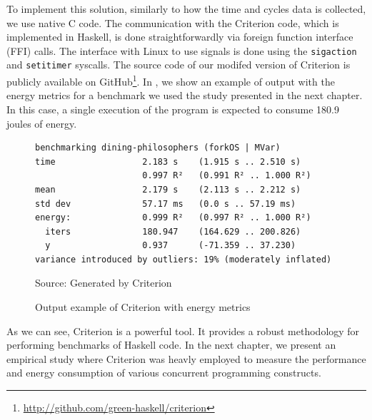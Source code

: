 To implement this solution, similarly to how the time and cycles data is collected, we use native C code. The communication with the Criterion code, which is implemented in Haskell, is done straightforwardly via foreign function interface (FFI) calls. The interface with Linux to use signals is done using the \texttt{sigaction} and \texttt{setitimer} syscalls. The source code of our modifed version of Criterion is publicly available on GitHub\footnote{\url{http://github.com/green-haskell/criterion}}. In , we show an example of output with the energy metrics for a benchmark we used the study presented in the next chapter. In this case, a single execution of the program is expected to consume 180.9 joules of energy.

\begin{figure}[htp]
  \centering
  \caption{Output example of Criterion with energy metrics}
	\begin{verbatim}
benchmarking dining-philosophers (forkOS | MVar)
time                 2.183 s    (1.915 s .. 2.510 s)
                     0.997 R²   (0.991 R² .. 1.000 R²)
mean                 2.179 s    (2.113 s .. 2.212 s)
std dev              57.17 ms   (0.0 s .. 57.19 ms)
energy:              0.999 R²   (0.997 R² .. 1.000 R²)
  iters              180.947    (164.629 .. 200.826)
  y                  0.937      (-71.359 .. 37.230)
variance introduced by outliers: 19% (moderately inflated)
  \end{verbatim}
  \footnotesize{Source: Generated by Criterion}
  \label{fig:fib-energy-output}
\end{figure}

As we can see, Criterion is a powerful tool. It provides a robust methodology for performing benchmarks of Haskell code. In the next chapter, we present an empirical study where Criterion was heavly employed to measure the performance and energy consumption of various concurrent programming constructs.
